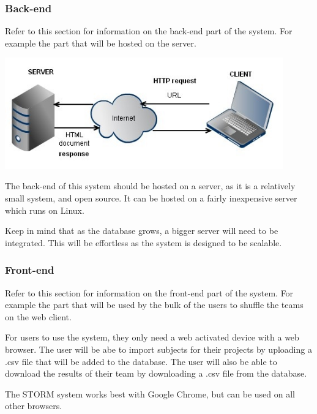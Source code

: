 \subsubsection{Back-end}
	Refer to this section for information on the back-end part of the system. For example the part that will be hosted on the server.\par
	\vspace{0.3cm}
	

\includegraphics[width=0.9\textwidth]{./graphics/LinuxServer.jpg}

The back-end of this system should be hosted on a server, as it is a relatively small system, and open source. It can be hosted on a fairly inexpensive server which runs on Linux.

Keep in mind that as the database grows, a bigger server will need to be integrated.  This will be effortless as the system is designed to be scalable.


\subsubsection{Front-end}
	Refer to this section for information on the front-end part of the system. For example the part that will be used by the bulk of the users to shuffle the teams on the web client.\par
	\vspace{0.3cm}
	
For users to use the system, they only need a web activated device with a web browser. The user will be abe to import subjects for their projects by uploading a .csv file that will be added to the database. The user will also be able to download the results of their team by downloading a .csv file from the database.

The STORM system works best with Google Chrome, but can be used on all other browsers.